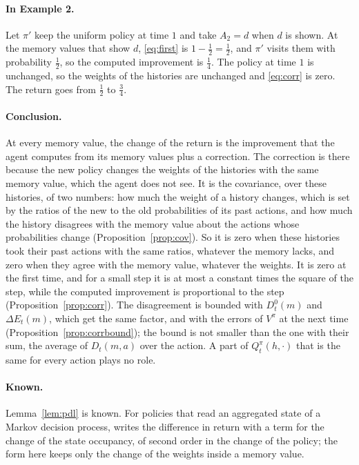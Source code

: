\documentclass{article}
\theoremstyle{definition}
\newcommand{\dE}{\Delta E}
\begin{document}
\paragraph{In Example 2.} Let $\pi'$ keep the uniform policy at time $1$ and take $A_2=d$ when $d$ is shown. At the memory values that show $d$, \eqref{eq:first} is $1-\tfrac12=\tfrac12$, and $\pi'$ visits them with probability $\tfrac12$, so the computed improvement is $\tfrac14$. The policy at time $1$ is unchanged, so the weights of the histories are unchanged and \eqref{eq:corr} is zero. The return goes from $\tfrac12$ to $\tfrac34$.

\paragraph{Conclusion.} At every memory value, the change of the return is the improvement that the agent computes from its memory values plus a correction. The correction is there because the new policy changes the weights of the histories with the same memory value, which the agent does not see. It is the covariance, over these histories, of two numbers: how much the weight of a history changes, which is set by the ratios of the new to the old probabilities of its past actions, and how much the history disagrees with the memory value about the actions whose probabilities change (Proposition~\ref{prop:cov}). So it is zero when these histories took their past actions with the same ratios, whatever the memory lacks, and zero when they agree with the memory value, whatever the weights. It is zero at the first time, and for a small step it is at most a constant times the square of the step, while the computed improvement is proportional to the step (Proposition~\ref{prop:corr}). The disagreement is bounded with $D^0_t(m)$ and $\dE_t(m)$, which get the same factor, and with the errors of $V^\pi$ at the next time (Proposition~\ref{prop:corrbound}); the bound is not smaller than the one with their sum, the average of $D_t(m,a)$ over the action. A part of $Q^\pi_t(h,\cdot)$ that is the same for every action plays no role.

\paragraph{Known.} Lemma~\ref{lem:pdl} is known. For policies that read an aggregated state of a Markov decision process, \citet{russo2020approximation} writes the difference in return with a term for the change of the state occupancy, of second order in the change of the policy; the form here keeps only the change of the weights inside a memory value.
\end{document}
